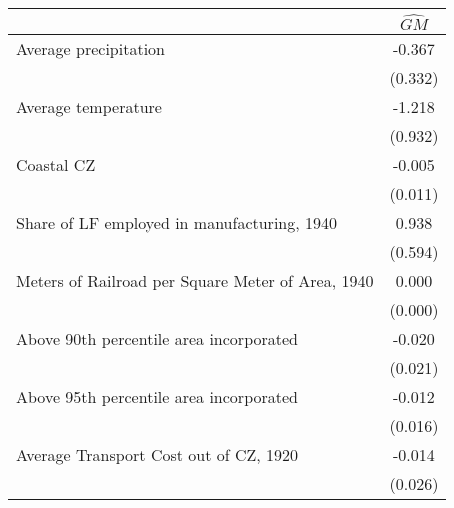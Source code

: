  \begin{tabular}{l*{1}{c}} \toprule
                &\multicolumn{1}{c}{$\widehat{GM}$}\\
\midrule
Average precipitation&   -0.367   \\
                &  (0.332)   \\
\addlinespace
Average temperature&   -1.218   \\
                &  (0.932)   \\
\addlinespace
Coastal CZ      &   -0.005   \\
                &  (0.011)   \\
\addlinespace
Share of LF employed in manufacturing, 1940&    0.938   \\
                &  (0.594)   \\
\addlinespace
Meters of Railroad per Square Meter of Area, 1940&    0.000   \\
                &  (0.000)   \\
\addlinespace
Above 90th percentile area incorporated&   -0.020   \\
                &  (0.021)   \\
\addlinespace
Above 95th percentile area incorporated&   -0.012   \\
                &  (0.016)   \\
\addlinespace
Average Transport Cost out of CZ, 1920&   -0.014   \\
                &  (0.026)   \\
 \bottomrule \end{tabular}
